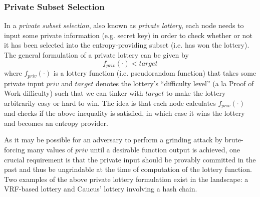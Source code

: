 \documentclass[letterpaper,twocolumn,10pt]{article}
\theoremstyle{definition}
\theoremstyle{remark}
\begin{document}
\subsubsection{Private Subset Selection}
\label{subsubsection:private-subset-selection}
In a \textit{private subset selection}, also known as \textit{private lottery}, each node needs to input some private information (e.g. secret key) in order to check whether or not it has been selected into the entropy-providing subset (i.e. has won the lottery). The general formulation of a private lottery can be given by
\[
f_{priv}(\cdot) < target
\]
where $f_{priv}(\cdot)$ is a lottery function (i.e. pseudorandom function) that takes some private input $priv$ and $target$ denotes the lottery's ``difficulty level'' (a la Proof of Work difficulty) such that we can tinker with $target$ to make the lottery arbitrarily easy or hard to win. The idea is that each node calculates $f_{priv}(\cdot)$ and checks if the above inequality is satisfied, in which case it wins the lottery and becomes an entropy provider.

As it may be possible for an adversary to perform a grinding attack by brute-forcing many values of $priv$ until a desirable function output is achieved, one crucial requirement is that the private input should be provably committed in the past and thus be ungrindable at the time of computation of the lottery function. Two examples of the above private lottery formulation exist in the landscape: a VRF-based lottery and Caucus' \cite{azouvi2018winning} lottery involving a hash chain.\\
\end{document}
